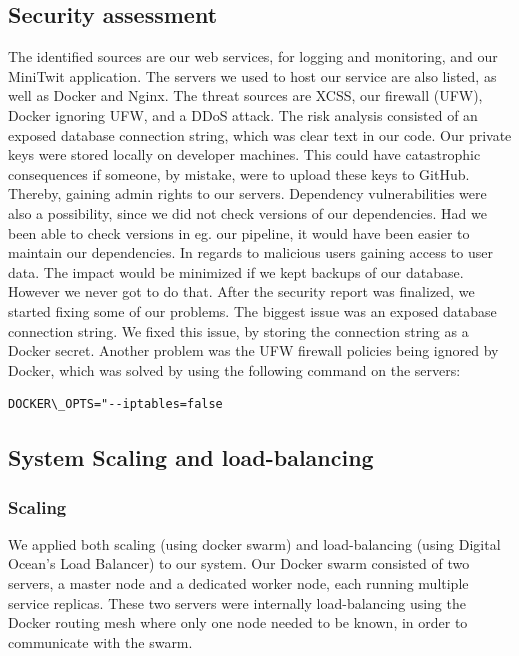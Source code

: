 \subsection{Security assessment}
The identified sources are our web services, for logging and monitoring, and our MiniTwit application.
The servers we used to host our service are also listed, as well as Docker and Nginx.
The threat sources are XCSS, our firewall (UFW), Docker ignoring UFW, and a DDoS attack.
The risk analysis consisted of an exposed database connection string, which was clear text in our code.
Our private keys were stored locally on developer machines. 
This could have catastrophic consequences if someone, by mistake, were to upload these keys to GitHub. Thereby, gaining admin rights to our servers.
Dependency vulnerabilities were also a possibility, since we did not check versions of our dependencies. 
Had we been able to check versions in eg. our pipeline, it would have been easier to maintain our dependencies.
In regards to malicious users gaining access to user data. The impact would be minimized if we kept backups of our database. However we never got to do that.
After the security report was finalized, we started fixing some of our problems. 
The biggest issue was an exposed database connection string. We fixed this issue, by storing the connection string as a Docker secret.
Another problem was the UFW firewall policies being ignored by Docker, which was solved by using the following command on the servers: 
\begin{lstlisting}
DOCKER\_OPTS="--iptables=false
\end{lstlisting}

\subsection{System Scaling and load-balancing}
\subsubsection{Scaling}
We applied both scaling (using docker swarm) and load-balancing (using Digital Ocean's Load Balancer) to our system. 
Our Docker swarm consisted of two servers, a master node and a dedicated worker node, each running multiple service replicas. 
These two servers were internally load-balancing using the Docker routing mesh where only one node needed to be known, in order to communicate with the swarm.


